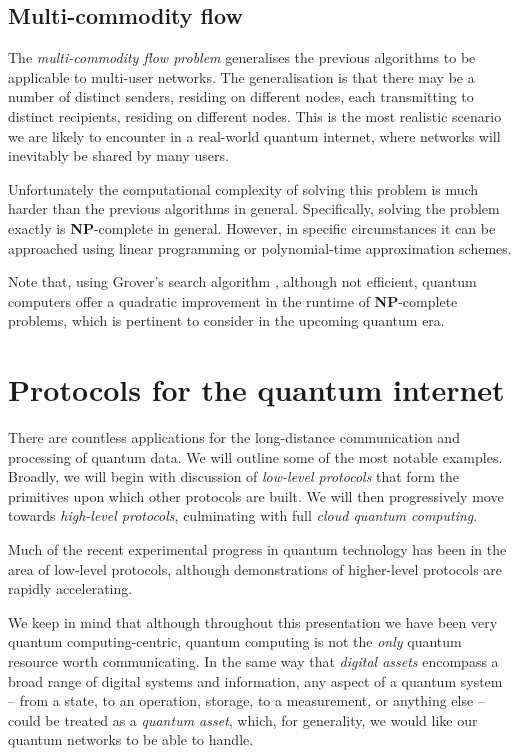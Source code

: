 \documentclass[aps,rmp,twocolumn,amsmath,amssymb,nofootinbib,superscriptaddress,longbibliography,floatfix]{revtex4-1}
\begin{document}
%
%

\subsection{Multi-commodity flow} \label{sec:multi_comm_flow}

The \emph{multi-commodity flow problem} \cite{???} generalises the previous algorithms to be applicable to multi-user networks. The generalisation is that there may be a number of distinct senders, residing on different nodes, each transmitting to distinct recipients, residing on different nodes. This is the most realistic scenario we are likely to encounter in a real-world quantum internet, where networks will inevitably be shared by many users.

Unfortunately the computational complexity of solving this problem is much harder than the previous algorithms in general. Specifically, solving the problem exactly is \textbf{NP}-complete in general. However, in specific circumstances it can be approached using linear programming or polynomial-time approximation schemes.

Note that, using Grover's search algorithm \cite{bib:Grover96}, although not efficient, quantum computers offer a quadratic improvement in the runtime of \textbf{NP}-complete problems, which is pertinent to consider in the upcoming quantum era.

%
%

\section{Protocols for the quantum internet} \label{sec:protocols_quant_int}

There are countless applications for the long-distance communication and processing of quantum data. We will outline some of the most notable examples. Broadly, we will begin with discussion of \emph{low-level protocols} that form the primitives upon which other protocols are built. We will then progressively move towards \emph{high-level protocols}, culminating with full \emph{cloud quantum computing}.

Much of the recent experimental progress in quantum technology has been in the area of low-level protocols, although demonstrations of higher-level protocols are rapidly accelerating.

We keep in mind that although throughout this presentation we have been very quantum computing-centric, quantum computing is not the \emph{only} quantum resource worth communicating. In the same way that \emph{digital assets} encompass a broad range of digital systems and information, any aspect of a quantum system -- from a state, to an operation, storage, to a measurement, or anything else -- could be treated as a \emph{quantum asset}, which, for generality, we would like our quantum networks to be able to handle.
\end{document}
